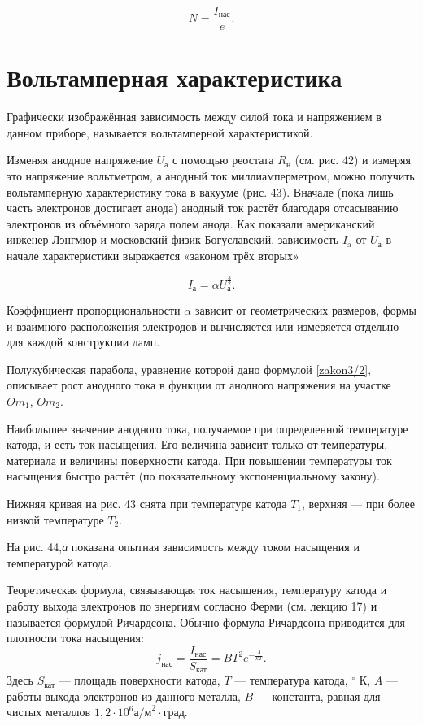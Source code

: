 \documentclass[a4paper,10pt]{book}
\begin{document}
\begin{equation}
N = \frac{I_\text{нас}}{e}.\nonumber
\end{equation}

\section{Вольтамперная характеристика}
Графически изображённая зависимость между силой тока и напряжением в данном приборе, называется вольтамперной характеристикой.

Изменяя анодное напряжение $U_\text{а}$ с помощью реостата $R_\text{н}$ (см. рис. 42) и измеряя это напряжение вольтметром, а анодный ток миллиамперметром, можно получить вольтамперную характеристику тока в вакууме (рис. 43). Вначале (пока лишь часть электронов достигает анода) анодный ток растёт благодаря отсасыванию электронов из объёмного заряда полем анода. Как показали американский инженер Лэнгмюр и московский физик Богуславский, зависимость $I_\text{a}$ от $U_\text{а}$ в начале характеристики выражается «законом трёх вторых»

\begin{equation}\label{zakon3/2}
I_\text{а} = \alpha U_\text{а}^{\frac{3}{2}}.
\end{equation}

Коэффициент пропорциональности $\alpha$ зависит от геометрических размеров, формы и взаимного расположения электродов и вычисляется или измеряется отдельно для каждой конструкции ламп.

Полукубическая парабола, уравнение которой дано формулой \ref{zakon3/2}, описывает рост анодного тока в функции от анодного напряжения на участке $Om_1$, $Om_2$.

Наибольшее значение анодного тока, получаемое при определенной температуре катода, и есть ток насыщения. Его величина зависит только от температуры, материала и величины поверхности катода. При повышении температуры ток насыщения быстро растёт (по показательному экспоненциальному закону).

Нижняя кривая на рис. 43 снята при температуре катода $T_1$, верхняя — при более низкой температуре $T_2$.

На рис. 44,\textit{а} показана опытная зависимость между током насыщения и температурой катода.

Теоретическая формула, связывающая ток насыщения, температуру катода и работу выхода электронов по энергиям согласно Ферми (см. лекцию 17) и называется формулой Ричардсона. Обычно формула Ричардсона приводится для плотности тока насыщения:
\begin{equation}
j_\text{нас} = \frac{I_\text{нас}}{S_\text{кат}} = BT^{2}e^{-\frac{A}{kT}}.
\end{equation}
Здесь $S_\text{кат}$ — площадь поверхности катода, $T$ — температура катода, $^{\circ}\text{ К}$, $A$ — работы выхода электронов из данного металла, $B$ — константа, равная для чистых металлов $1,2\cdot10^{6} \text{а/м}^{2}\cdot\text{град}$.
\end{document}
